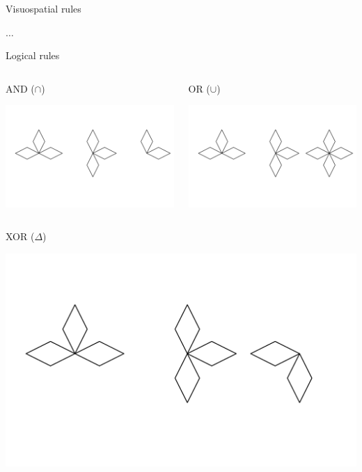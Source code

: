 \documentclass{beamer}
\begin{document}
\begin{frame}{Visuospatial rules}
	\vspace{5mm}
	\centering
	\Large

$\ldots$
	
\end{frame}

\begin{frame}{Logical rules}
	\begin{columns}[T]
		\begin{column}{.50\linewidth}
			\centering
		AND ($\cap$)
		
		\includegraphics[width=.7\linewidth]{img/and.pdf}
		\end{column}
		
		\begin{column}{.50\linewidth}
			\centering
			OR ($\cup$)
			
				\includegraphics[width=.7\linewidth]{img/or.pdf}
		\end{column}
	\end{columns}
	
	\vspace{5mm}
	\centering
	
	XOR ($\Delta$)
	
		\includegraphics[width=.5\linewidth]{img/xor.pdf}
	
\end{frame}
\end{document}
